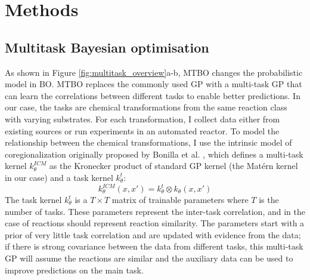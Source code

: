 \section{Methods}

\subsection{Multitask Bayesian optimisation}

As shown in Figure \ref{fig:multitask_overview}a-b, MTBO changes the probabilistic model in BO.  MTBO replaces the commonly used GP with a multi-task GP that can learn the correlations between different tasks to enable better predictions. In our case, the tasks are chemical transformations from the same reaction class with varying substrates. For each transformation, I collect data either from existing sources or run experiments in an automated reactor. To model the relationship between the chemical transformations, I use the intrinsic model of coregionalization originally proposed by Bonilla et al. \cite{Bonilla2007}, which defines a multi-task kernel $k^{ICM}_{\theta}$ as the Kronecker product of standard GP kernel (the Matérn kernel in our case) and a task kernel $k^t_{\theta}$:
\begin{equation}
    k^{ICM}_{\theta}(x,x') = k^t_{\theta} \otimes  k_{\theta}(x,x')
\end{equation}
The task kernel $k^t_{\theta}$ is a $T \times T$ matrix of trainable parameters where $T$ is the number of tasks. These parameters represent the inter-task correlation, and in the case of reactions should represent reaction similarity. The parameters start with a prior of very little task correlation and are updated with evidence from the data; if there is strong covariance between the data from different tasks, this multi-task GP will assume the reactions are similar and the auxiliary data can be used to improve predictions on the main task.

